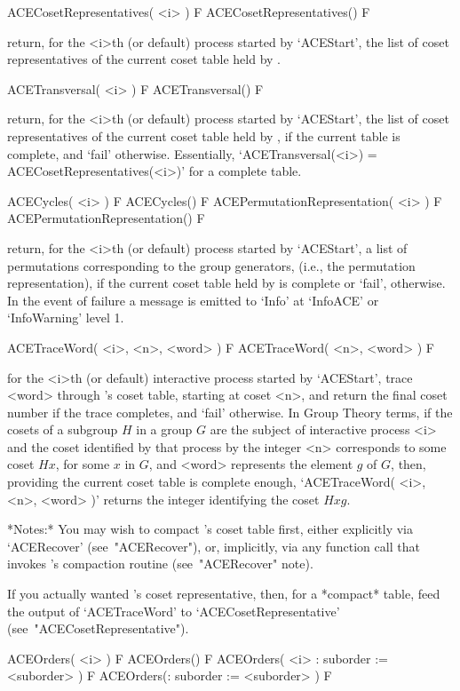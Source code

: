 \>ACECosetRepresentatives( <i> ) F
\>ACECosetRepresentatives() F

return, for the <i>th (or default) process started by `ACEStart',  the
list of coset representatives of  the  current  coset  table  held  by
{\ACE}.

\>ACETransversal( <i> ) F
\>ACETransversal() F

return, for the <i>th (or default) process started by `ACEStart',  the
list of coset representatives of  the  current  coset  table  held  by
{\ACE}, if the  current  table  is  complete,  and  `fail'  otherwise.
Essentially, `ACETransversal(<i>) = ACECosetRepresentatives(<i>)'  for
a complete table.

\>ACECycles( <i> ) F
\>ACECycles() F
\>ACEPermutationRepresentation( <i> ) F
\>ACEPermutationRepresentation() F

return, for the <i>th (or default) process started  by  `ACEStart',  a
list of permutations corresponding to the group generators, (i.e., the
permutation representation), if the current coset table held by {\ACE}
is complete or `fail', otherwise. In the event of failure a message is
emitted to `Info' at `InfoACE' or `InfoWarning' level 1.

\>ACETraceWord( <i>, <n>, <word> ) F
\>ACETraceWord( <n>, <word> ) F

for the <i>th (or  default)  interactive  {\ACE}  process  started  by
`ACEStart', trace <word> through {\ACE}'s  coset  table,  starting  at
coset <n>, and return the final coset number if the  trace  completes,
and `fail' otherwise. In Group  Theory  terms,  if  the  cosets  of  a
subgroup $H$ in a group $G$ are  the  subject  of  interactive  {\ACE}
process <i> and the coset identified by that process  by  the  integer
<n> corresponds to some coset $Hx$, for some $x$ in  $G$,  and  <word>
represents the element $g$ of $G$, then, providing the  current  coset
table is complete enough, `ACETraceWord( <i>, <n>, <word>  )'  returns
the integer identifying the coset $Hxg$.

*Notes:*
You may wish to compact {\ACE}'s coset table first, either  explicitly
via `ACERecover' (see~"ACERecover"), or, implicitly, via any  function
call that invokes {\ACE}'s compaction routine (see~"ACERecover" note).

If you actually wanted {\ACE}'s  coset  representative,  then,  for  a
*compact*   table,   feed   the   output    of    `ACETraceWord'    to
`ACECosetRepresentative' (see~"ACECosetRepresentative").

\>ACEOrders( <i> ) F
\>ACEOrders() F
\>ACEOrders( <i> : suborder := <suborder> ) F
\>ACEOrders(: suborder := <suborder> ) F

